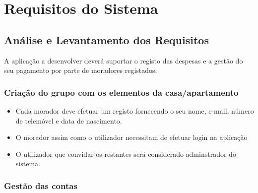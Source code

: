 \chapter{Requisitos do Sistema}

\section{Análise e Levantamento dos Requisitos}
A aplicação a desenvolver deverá suportar o registo das despesas e a gestão do seu pagamento por parte de moradores registados.

\subsection{Criação do grupo com os elementos da casa/apartamento}

\begin{itemize}
	

\item{Cada morador deve efetuar um registo fornecendo o seu nome, e-mail, número de telemóvel e data de nascimento.}

\item{O morador assim como o utilizador necessitam de efetuar login na aplicação}

\item{O utilizador que convidar os restantes será considerado adminstrador do sistema.} 

\end{itemize}

\subsection{Gestão das contas}

